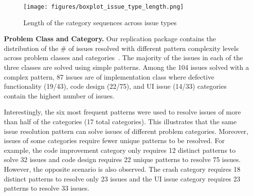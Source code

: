 \begin{figure}[t]
 \centering
 \texttt{[image: figures/boxplot\_issue\_type\_length.png]}
 \caption{Length of the category sequences across issue types}
 \label{fig:boxplot_issue_type_length}
 \vspace{-0.2cm}
\end{figure}


\textbf{Problem Class and Category.}
Our replication package contains the distribution of the \# of issues resolved with different pattern complexity levels across problem classes and categories~\cite{repl_pack}.  The majority of the issues in each of the three classes are solved using simple patterns. 
Among the 104 issues solved with a complex pattern, 87 issues are of implementation class where defective functionality (19/43), code design (22/75), and UI issue (14/33) categories contain the highest number of issues. 

Interestingly, the six most frequent patterns were used to resolve issues of more than half of the categories (17 total categories). This illustrates that the same issue resolution pattern can solve issues of different problem categories. Moreover, issues of some categories require fewer unique patterns to be resolved. For example, the code improvement category only requires 12 distinct patterns to solve 32 issues and code design requires 22 unique patterns to resolve 75 issues. However, the opposite scenario is also observed. The crash category requires 18 distinct patterns to resolve only 23 issues and the UI issue category requires 23 patterns to resolve 33 issues. 



